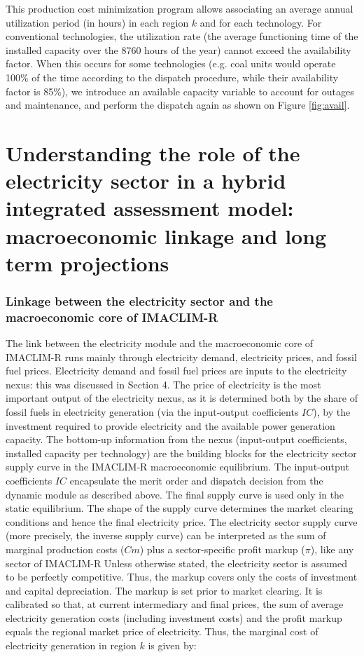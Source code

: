 This production cost minimization program allows associating an average annual utilization period (in hours) in each region $k$ and for each technology. For conventional technologies, the utilization rate (the average functioning time of the installed capacity over the 8760 hours of the year) cannot exceed the availability factor. When this occurs for some technologies (e.g. coal units would operate 100\% of the time according to the dispatch procedure, while their availability factor is 85\%), we introduce an available capacity variable to account for outages and maintenance, and perform the dispatch again as shown on Figure \ref{fig:avail}.

\part*{Understanding the role of the electricity sector in a hybrid integrated assessment model: macroeconomic linkage and long term projections}

\section{Linkage between the electricity sector and the macroeconomic core of IMACLIM-R}

The link between the electricity module and the macroeconomic core of IMACLIM-R runs mainly through electricity demand, electricity prices, and fossil fuel prices. Electricity demand and fossil fuel prices are inputs to the electricity nexus: this was discussed in Section 4. The price of electricity is the most important output of the electricity nexus, as it is determined both by the share of fossil fuels in electricity generation (via the input-output coefficients $IC$), by the investment required to provide electricity and the available power generation capacity.
The bottom-up information from the nexus (input-output coefficients, installed capacity per technology) are the building blocks for the electricity sector supply curve in the IMACLIM-R macroeconomic equilibrium. The input-output coefficients $IC$ encapsulate the merit order and dispatch decision from the dynamic module as described above. The final supply curve is used only in the static equilibrium.
The shape of the supply curve determines the market clearing conditions and hence the final electricity price. The electricity sector supply curve (more precisely, the inverse supply curve) can be interpreted as the sum of marginal production costs ($Cm$) plus a sector-specific profit markup ($\pi$), like any sector of IMACLIM-R 
Unless otherwise stated, the electricity sector is assumed to be perfectly competitive. Thus, the markup covers only the costs of investment and capital depreciation. The markup is set prior to market clearing. It is calibrated so that, at current intermediary and final prices, the sum of average electricity generation costs (including investment costs) and the profit markup equals the regional market price of electricity.
Thus, the marginal cost of electricity generation in region $k$ is given by:

